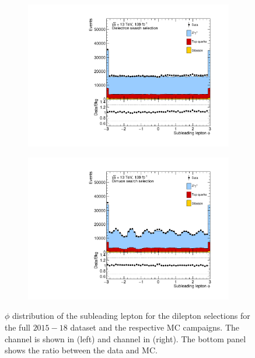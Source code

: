 \begin{figure}[]
    \centering
    \begin{subfigure}[b]{0.49\textwidth}
        \centering
        \includegraphics[width=\textwidth]{figures/analysis/datamc/dataMCcompare/ee_phi2.pdf}
        \label{fig:datamc:eephi2}
    \end{subfigure}
    \begin{subfigure}[b]{0.49\textwidth}
        \centering
        \includegraphics[width=\textwidth]{figures/analysis/datamc/dataMCcompare/uu_phi2.pdf}
        \label{fig:datamc:uuphi2}
    \end{subfigure}
    \caption[$\phi$ distribution of the subleading lepton for the dilepton selections for the full $2015-18$ dataset and the respective MC campaigns.]{$\phi$ distribution of the subleading lepton for the dilepton selections for the full $2015-18$ dataset and the respective MC campaigns. The \ee channel is shown in (left) and \mumu channel in (right). The bottom panel shows the ratio between the data and MC.}
    \label{fig:datamc:phi2}
\end{figure}

\clearpage